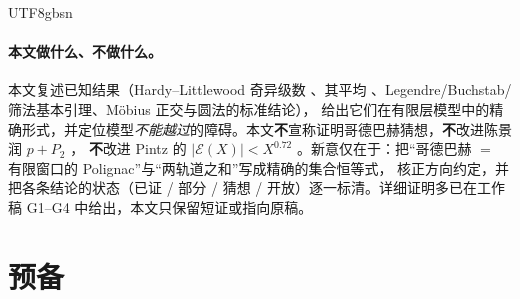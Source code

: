\documentclass[11pt,a4paper]{article}
\newcommand{\Exc}{\mathcal E}          %
\theoremstyle{plain}
\theoremstyle{definition}
\begin{document}
\begin{CJK}{UTF8}{gbsn}
\paragraph{本文做什么、不做什么。}
本文复述已知结果（Hardy--Littlewood 奇异级数 \cite{HL23}、其平均 \cite{Gal76,FG95}、Legendre/Buchstab/筛法基本引理、M\"obius 正交与圆法的标准结论），
给出它们在有限层模型中的精确形式，并定位模型\emph{不能越过}的障碍。本文\textbf{不}宣称证明哥德巴赫猜想，\textbf{不}改进陈景润 $p+P_2$ \cite{Chen73}，
\textbf{不}改进 Pintz 的 $|\Exc(X)|<X^{0.72}$ \cite{Pin18}。新意仅在于：把“哥德巴赫 $=$ 有限窗口的 Polignac”与“两轨道之和”写成精确的集合恒等式，
核正方向约定，并把各条结论的状态（已证 / 部分 / 猜想 / 开放）逐一标清。详细证明多已在工作稿 G1--G4 \cite{G1,G2,G3,G4} 中给出，本文只保留短证或指向原稿。

\section{预备}\label{paper:sec:prelim}


\end{CJK}
\end{document}
